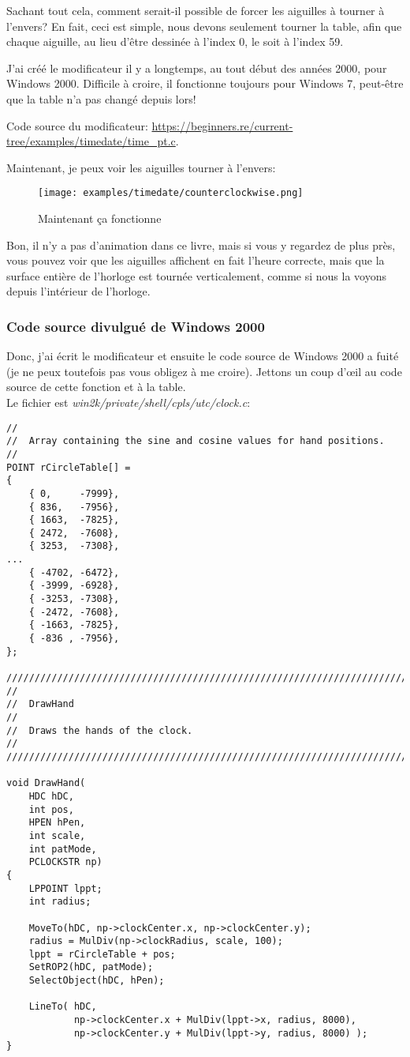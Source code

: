 Sachant tout cela, comment serait-il possible de forcer les aiguilles à tourner à
l'envers?
En fait, ceci est simple, nous devons seulement tourner la table, afin que chaque
aiguille, au lieu d'être dessinée à l'index 0, le soit à l'index 59.

J'ai créé le modificateur il y a longtemps, au tout début des années 2000, pour Windows 2000.
Difficile à croire, il fonctionne toujours pour Windows 7, peut-être que la table
n'a pas changé depuis lors!

Code source du modificateur: \url{https://beginners.re/current-tree/examples/timedate/time_pt.c}.

Maintenant, je peux voir les aiguilles tourner à l'envers:

\begin{figure}[H]
\centering
\texttt{[image: examples/timedate/counterclockwise.png]}
\caption{Maintenant ça fonctionne}
\end{figure}

Bon, il n'y a pas d'animation dans ce livre, mais si vous y regardez de plus près,
vous pouvez voir que les aiguilles affichent en fait l'heure correcte, mais que la
surface entière de l'horloge est tournée verticalement, comme si nous la voyons depuis
l'intérieur de l'horloge.

\subsubsection{Code source divulgué de Windows 2000}

Donc, j'ai écrit le modificateur et ensuite le code source de Windows 2000 a fuité
(je ne peux toutefois pas vous obligez à me croire).
Jettons un coup d'\oe{}il au code source de cette fonction et à la table.\\
Le fichier est \emph{win2k/private/shell/cpls/utc/clock.c}:

\begin{lstlisting}[style=customc]
//
//  Array containing the sine and cosine values for hand positions.
//
POINT rCircleTable[] =
{
    { 0,     -7999},
    { 836,   -7956},
    { 1663,  -7825},
    { 2472,  -7608},
    { 3253,  -7308},
...
    { -4702, -6472},
    { -3999, -6928},
    { -3253, -7308},
    { -2472, -7608},
    { -1663, -7825},
    { -836 , -7956},
};

////////////////////////////////////////////////////////////////////////////
//
//  DrawHand
//
//  Draws the hands of the clock.
//
////////////////////////////////////////////////////////////////////////////

void DrawHand(
    HDC hDC,
    int pos,
    HPEN hPen,
    int scale,
    int patMode,
    PCLOCKSTR np)
{
    LPPOINT lppt;
    int radius;

    MoveTo(hDC, np->clockCenter.x, np->clockCenter.y);
    radius = MulDiv(np->clockRadius, scale, 100);
    lppt = rCircleTable + pos;
    SetROP2(hDC, patMode);
    SelectObject(hDC, hPen);

    LineTo( hDC,
            np->clockCenter.x + MulDiv(lppt->x, radius, 8000),
            np->clockCenter.y + MulDiv(lppt->y, radius, 8000) );
}
\end{lstlisting}

